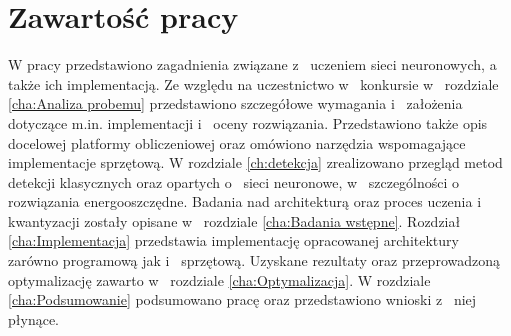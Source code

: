 \section{Zawartość pracy}
\label{sec:zawartoscPracy}
W pracy przedstawiono zagadnienia związane z~ uczeniem sieci neuronowych, a~ także ich implementacją. Ze względu na uczestnictwo w~ konkursie w~ rozdziale \ref{cha:Analiza probemu} przedstawiono szczegółowe wymagania i~ założenia dotyczące m.in. implementacji i~ oceny rozwiązania. Przedstawiono także opis docelowej platformy obliczeniowej oraz omówiono narzędzia wspomagające implementacje sprzętową.
W rozdziale \ref{ch:detekcja} zrealizowano przegląd metod detekcji klasycznych oraz opartych o~ sieci neuronowe, w~ szczególności o~ rozwiązania energooszczędne.
Badania nad architekturą oraz proces uczenia i~ kwantyzacji zostały opisane w~ rozdziale \ref{cha:Badania wstępne}.
Rozdział \ref{cha:Implementacja} przedstawia implementację opracowanej architektury zarówno programową jak i~ sprzętową. 
Uzyskane rezultaty oraz przeprowadzoną optymalizację zawarto w~ rozdziale \ref{cha:Optymalizacja}. 
W rozdziale \ref{cha:Podsumowanie} podsumowano pracę oraz przedstawiono wnioski z~ niej płynące. 

